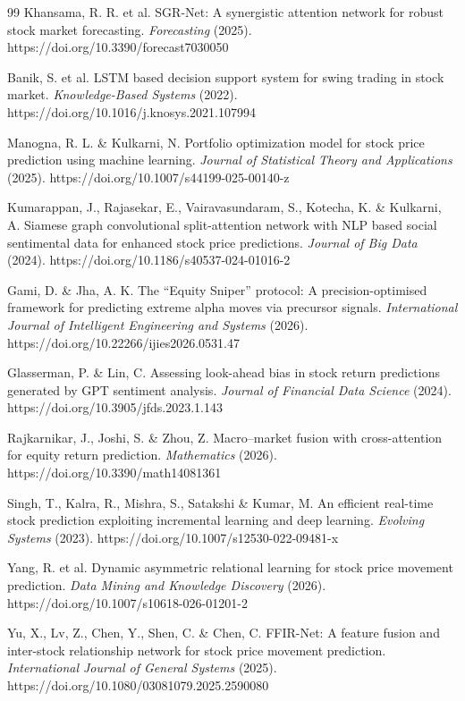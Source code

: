 \documentclass[fleqn,10pt]{wlscirep}
\begin{document}
\begin{thebibliography}{99}
Khansama, R. R. et al. SGR-Net: A synergistic attention network for robust stock market forecasting. \textit{Forecasting} (2025). https://doi.org/10.3390/forecast7030050

Banik, S. et al. LSTM based decision support system for swing trading in stock market. \textit{Knowledge-Based Systems} (2022). https://doi.org/10.1016/j.knosys.2021.107994

Manogna, R. L. \& Kulkarni, N. Portfolio optimization model for stock price prediction using machine learning. \textit{Journal of Statistical Theory and Applications} (2025). https://doi.org/10.1007/s44199-025-00140-z

Kumarappan, J., Rajasekar, E., Vairavasundaram, S., Kotecha, K. \& Kulkarni, A. Siamese graph convolutional split-attention network with NLP based social sentimental data for enhanced stock price predictions. \textit{Journal of Big Data} (2024). https://doi.org/10.1186/s40537-024-01016-2

Gami, D. \& Jha, A. K. The ``Equity Sniper'' protocol: A precision-optimised framework for predicting extreme alpha moves via precursor signals. \textit{International Journal of Intelligent Engineering and Systems} (2026). https://doi.org/10.22266/ijies2026.0531.47

Glasserman, P. \& Lin, C. Assessing look-ahead bias in stock return predictions generated by GPT sentiment analysis. \textit{Journal of Financial Data Science} (2024). https://doi.org/10.3905/jfds.2023.1.143

Rajkarnikar, J., Joshi, S. \& Zhou, Z. Macro--market fusion with cross-attention for equity return prediction. \textit{Mathematics} (2026). https://doi.org/10.3390/math14081361

Singh, T., Kalra, R., Mishra, S., Satakshi \& Kumar, M. An efficient real-time stock prediction exploiting incremental learning and deep learning. \textit{Evolving Systems} (2023). https://doi.org/10.1007/s12530-022-09481-x

Yang, R. et al. Dynamic asymmetric relational learning for stock price movement prediction. \textit{Data Mining and Knowledge Discovery} (2026). https://doi.org/10.1007/s10618-026-01201-2

Yu, X., Lv, Z., Chen, Y., Shen, C. \& Chen, C. FFIR-Net: A feature fusion and inter-stock relationship network for stock price movement prediction. \textit{International Journal of General Systems} (2025). https://doi.org/10.1080/03081079.2025.2590080


\end{thebibliography}
\end{document}
